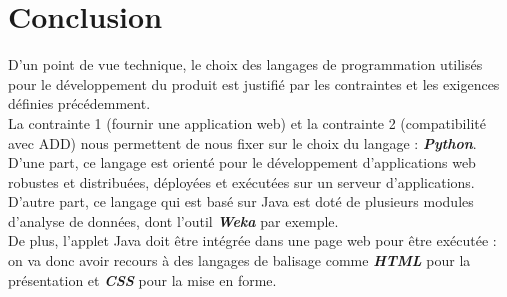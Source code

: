 	\section{Conclusion}
	D'un point de vue technique, le choix des langages de programmation utilisés pour le développement du produit est justifié par les contraintes et les exigences définies précédemment.\\
	La contrainte 1 (fournir une application web) et la contrainte 2 (compatibilité avec ADD) nous permettent de nous fixer sur le choix du langage : \textbf{\textit{Python}}.\\
	D'une part, ce langage est orienté pour le développement d'applications web robustes et distribuées, déployées et exécutées sur un serveur d'applications. D'autre part, ce langage qui est basé sur Java est doté de plusieurs modules d'analyse de données, dont l'outil \textbf{\textit{Weka}} par exemple.\\
	De plus, l'applet Java doit être intégrée dans une page web pour être exécutée : on va donc avoir recours à des langages de balisage comme \textbf{\textit{HTML}} pour la présentation et \textbf{\textit{CSS}} pour la mise en forme.


